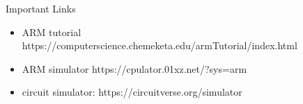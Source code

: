 


\begin{frame}{Important Links}

    \begin{itemize}
        \item ARM tutorial https://computerscience.chemeketa.edu/armTutorial/index.html
        \item ARM simulator https://cpulator.01xz.net/?sys=arm
        \item circuit simulator: https://circuitverse.org/simulator
    \end{itemize}

\end{frame}
